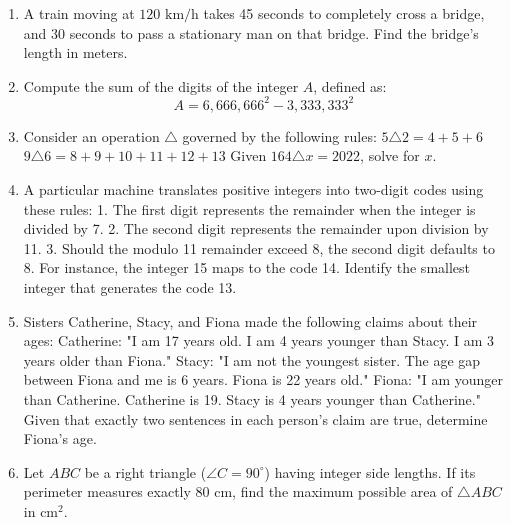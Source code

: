 \documentclass[12pt]{scrartcl}
\begin{document}
\begin{enumerate}
    \item A train moving at $120\text{ km/h}$ takes 45 seconds to completely cross a bridge, and 30 seconds to pass a stationary man on that bridge. Find the bridge's length in meters.

    \item Compute the sum of the digits of the integer $A$, defined as:
    \[ A = 6,666,666^2 - 3,333,333^2 \]

    \item Consider an operation $\triangle$ governed by the following rules:
    $5 \triangle 2 = 4 + 5 + 6$
    $9 \triangle 6 = 8 + 9 + 10 + 11 + 12 + 13$
    Given $164 \triangle x = 2022$, solve for $x$.

    \item A particular machine translates positive integers into two-digit codes using these rules:
    1. The first digit represents the remainder when the integer is divided by 7.
    2. The second digit represents the remainder upon division by 11.
    3. Should the modulo 11 remainder exceed 8, the second digit defaults to 8.
    For instance, the integer 15 maps to the code 14. Identify the smallest integer that generates the code 13.

    \item Sisters Catherine, Stacy, and Fiona made the following claims about their ages:
    Catherine: "I am 17 years old. I am 4 years younger than Stacy. I am 3 years older than Fiona."
    Stacy: "I am not the youngest sister. The age gap between Fiona and me is 6 years. Fiona is 22 years old."
    Fiona: "I am younger than Catherine. Catherine is 19. Stacy is 4 years younger than Catherine."
    Given that exactly two sentences in each person's claim are true, determine Fiona's age.

    \item Let $ABC$ be a right triangle ($\angle C = 90^\circ$) having integer side lengths. If its perimeter measures exactly $80\text{ cm}$, find the maximum possible area of $\triangle ABC$ in $\text{cm}^2$.
\end{enumerate}
\end{document}
